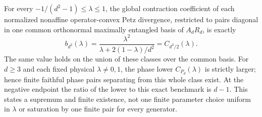 \begin{proposition}\label{prop:allbell-endpoint}
For every $-1/(d^2-1)\le\lambda\le1$, the global contraction coefficient of each normalized nonaffine operator-convex Petz divergence, restricted to pairs diagonal in one common orthonormal maximally entangled basis of $A_dR_d$, is exactly
\[
 b_{d^2}(\lambda)=\frac{\lambda^2}{\lambda+2(1-\lambda)/d^2}
                =C_{d^2/2}(\lambda).
\]
The same value holds on the union of these classes over the common basis. For $d\ge3$ and each fixed physical $\lambda\ne0,1$, the phase lower $C_{P_d}(\lambda)$ is strictly larger; hence finite faithful phase pairs separating from this whole class exist. At the negative endpoint the ratio of the lower to this exact benchmark is $d-1$. This states a supremum and finite existence, not one finite parameter choice uniform in $\lambda$ or saturation by one finite pair for every generator.
\end{proposition}
